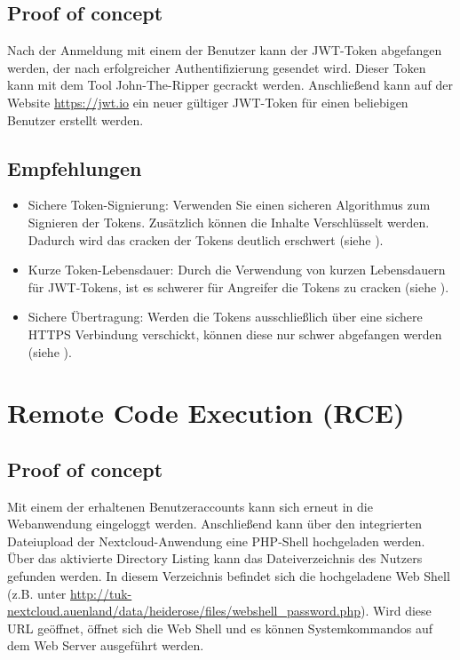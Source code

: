 \subsection*{Proof of concept}
Nach der Anmeldung mit einem der Benutzer kann der JWT-Token abgefangen werden, der nach erfolgreicher Authentifizierung gesendet wird. Dieser Token kann mit dem Tool John-The-Ripper gecrackt werden. Anschließend kann auf der Website \url{https://jwt.io} ein neuer gültiger JWT-Token für einen beliebigen Benutzer erstellt werden. 

\subsection*{Empfehlungen}
\begin{itemize}
    \item Sichere Token-Signierung: Verwenden Sie einen sicheren Algorithmus zum Signieren der Tokens. Zusätzlich können die Inhalte Verschlüsselt werden. Dadurch wird das cracken der Tokens deutlich erschwert (siehe \cite{owaspSessionManagement}).
    \item Kurze Token-Lebensdauer: Durch die Verwendung von kurzen Lebensdauern für JWT-Tokens, ist es schwerer für Angreifer die Tokens zu cracken (siehe \cite{owaspSessionManagement}).
    \item Sichere Übertragung: Werden die Tokens ausschließlich über eine sichere HTTPS Verbindung verschickt, können diese nur schwer abgefangen werden (siehe \cite{owaspSessionManagement}).
\end{itemize}


\section{\makecvssbadge Remote Code Execution (RCE)}

\subsection*{Proof of concept}
Mit einem der erhaltenen Benutzeraccounts kann sich erneut in die Webanwendung eingeloggt werden. Anschließend kann über den integrierten Dateiupload der Nextcloud-Anwendung eine PHP-Shell hochgeladen werden. Über das aktivierte Directory Listing kann das Dateiverzeichnis des Nutzers gefunden werden. In diesem Verzeichnis befindet sich die hochgeladene Web Shell (z.B. unter \url{http://tuk-nextcloud.auenland/data/heiderose/files/webshell_password.php}). Wird diese URL geöffnet, öffnet sich die Web Shell und es können Systemkommandos auf dem Web Server ausgeführt werden. 

